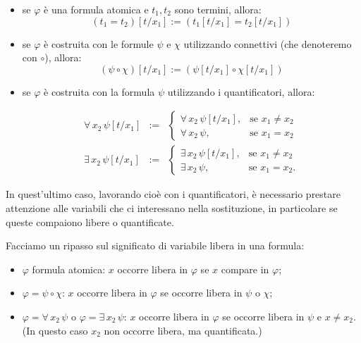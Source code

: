 \begin{itemize}
 \item se $\varphi$ \`e una formula atomica e $t_1,t_2$ sono termini, allora:
$$
(t_1=t_2)[t/x_1] := (t_1[t/x_1]=t_2[t/x_1])
$$

\item se $\varphi$ \`e costruita con le formule $\psi$ e $\chi$ utilizzando connettivi (che denoteremo con $\circ$), allora:
$$
(\psi \circ \chi)[t/x_1] := (\psi[t/x_1]\circ \chi[t/x_1])
$$

\item se $\varphi$ \`e costruita con la formula $\psi$ utilizzando i quantificatori, allora:

\begin{eqnarray*}
 \forall\, x_2\, \psi [t/x_1]  &:=&    \left \{ \begin{array}{ll}
\forall\, x_2\, \psi [t/x_1], & \textrm{se $x_1 \ne x_2$}\\
\forall\, x_2\, \psi, & \textrm{se $x_1 = x_2$}
\end{array}\right.\\
\exists\, x_2\, \psi [t/x_1]  &:=& \left \{ \begin{array}{ll}
\exists\, x_2\, \psi [t/x_1], & \textrm{se $x_1 \ne x_2$}\\
\exists\, x_2\, \psi, & \textrm{se $x_1 = x_2$}.
\end{array}\right.
\end{eqnarray*}

\end{itemize}

In quest'ultimo caso, lavorando cio\`e con i quantificatori, \`e necessario prestare attenzione alle variabili che ci interessano nella sostituzione, in particolare se queste compaiono libere o quantificate.

Facciamo un ripasso sul significato di variabile libera in una formula:
\begin{itemize}
 \item $\varphi$ formula atomica: $x$ occorre libera in $\varphi$ se $x$ compare in $\varphi$;
\item $\varphi=\psi\circ \chi$: $x$ occorre libera in $\varphi$ se occorre libera in $\psi$ o $\chi$;
\item $\varphi=\forall \,x_2\, \psi$ o $\varphi=\exists \,x_2\, \psi$: $x$ occorre libera in $\varphi$ se occorre libera in $\psi$ e $x \ne x_2$. (In questo caso $x_2$ non occorre libera, ma quantificata.)
 \end{itemize}

